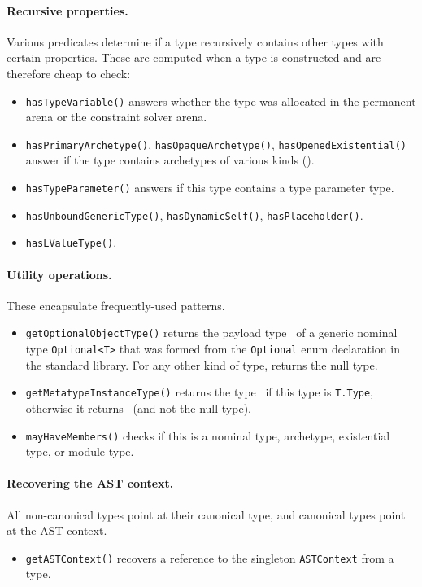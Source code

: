 \documentclass[../generics]{subfiles}
\begin{document}
\paragraph{Recursive properties.} Various predicates determine if a type recursively contains other types with certain properties. These are computed when a type is constructed and are therefore cheap to check:
\begin{itemize}
\item \texttt{hasTypeVariable()} answers whether the type was allocated in the permanent arena or the constraint solver arena.
\item \texttt{hasPrimaryArchetype()}, \texttt{hasOpaqueArchetype()}, \texttt{hasOpenedExistential()}\\
answer if the type contains archetypes of various kinds ().
\item \texttt{hasTypeParameter()} answers if this type contains a type parameter type.
\item \texttt{hasUnboundGenericType()}, \texttt{hasDynamicSelf()}, \texttt{hasPlaceholder()}.
\item \texttt{hasLValueType()}.
\end{itemize}

\paragraph{Utility operations.} These encapsulate frequently-used patterns.
\begin{itemize}
\item \texttt{getOptionalObjectType()} returns the payload type \tT\ of a generic nominal type \texttt{Optional<T>} that was formed from the \texttt{Optional} enum declaration in the standard library. For any other kind of type, returns the null type.
\item \texttt{getMetatypeInstanceType()} returns the type \tT\ if this type is \texttt{T.Type}, otherwise it returns \tT\ (and not the null type).
\item \texttt{mayHaveMembers()} checks if this is a nominal type, archetype, existential type, or module type.
\end{itemize}

\paragraph{Recovering the AST context.} All non-canonical types point at their canonical type, and canonical types point at the AST context.
\begin{itemize}
\item \texttt{getASTContext()} recovers a reference to the singleton \texttt{ASTContext} from a type.
\end{itemize}
\end{document}
